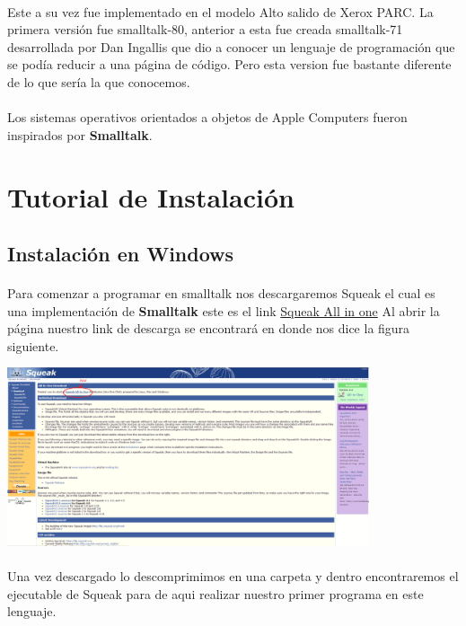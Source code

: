 \documentclass[11pt]{article}
\begin{document}
\paragraph{} \noindent
Este a su vez fue implementado en el modelo Alto salido de Xerox PARC. La primera versión fue smalltalk-80, anterior a esta fue creada smalltalk-71 desarrollada por Dan Ingallis que dio a conocer un lenguaje de programación que se podía reducir a una página de código. Pero esta version fue bastante diferente de lo que sería la que conocemos.
\paragraph{} \noindent
Los sistemas operativos orientados a objetos de Apple Computers fueron inspirados por \textbf{Smalltalk}\cite{Kay}.
\section{\textbf{Tutorial de Instalación}}
\subsection{\textbf{Instalación en Windows}}
\paragraph{} \noindent
Para comenzar a programar en smalltalk nos descargaremos Squeak el cual es una implementación de \textbf{Smalltalk} este es el link \href{http://www.squeak.org/Download/}{Squeak All in one}
Al abrir la página nuestro link de descarga se encontrará en donde nos dice la figura siguiente.

				\begin{center}
				\includegraphics[width=0.8\textwidth]{images/tutorial}
				\end{center}
\paragraph{} \noindent
Una vez descargado lo descomprimimos en una carpeta y dentro encontraremos el ejecutable de Squeak para de aqui realizar nuestro primer programa en este lenguaje.
\end{document}
